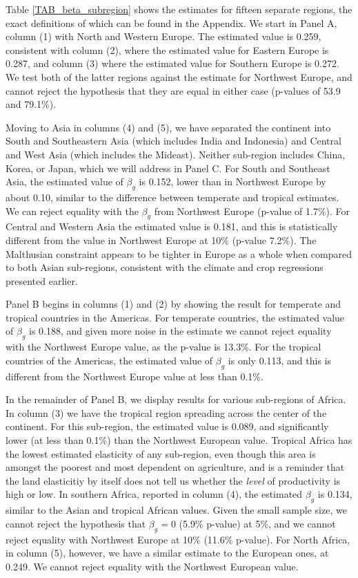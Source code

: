 Table \ref{TAB_beta_subregion} shows the estimates for fifteen separate regions, the exact definitions of which can be found in the Appendix. We start in Panel A, column (1) with North and Western Europe. The estimated value is 0.259, consistent with column (2), where the estimated value for Eastern Europe is 0.287, and column (3) where the estimated value for Southern Europe is 0.272. We test both of the latter regions against the estimate for Northwest Europe, and cannot reject the hypothesis that they are equal in either case (p-values of 53.9 and 79.1\%). 

Moving to Asia in columns (4) and (5), we have separated the continent into South and Southeastern Asia (which includes India and Indonesia) and Central and West Asia (which includes the Mideast). Neither sub-region includes China, Korea, or Japan, which we will address in Panel C. For South and Southeast Asia, the estimated value of $\beta_g$ is 0.152, lower than in Northwest Europe by about 0.10, similar to the difference between temperate and tropical estimates. We can reject equality with the $\beta_g$ from Northwest Europe (p-value of 1.7\%). For Central and Western Asia the estimated value is 0.181, and this is statistically different from the value in Northwest Europe at 10\% (p-value 7.2\%). The Malthusian constraint appears to be tighter in Europe as a whole when compared to both Asian sub-regions, consistent with the climate and crop regressions presented earlier.

Panel B begins in columns (1) and (2) by showing the result for temperate and tropical countries in the Americas. For temperate countries, the estimated value of $\beta_g$ is 0.188, and given more noise in the estimate we cannot reject equality with the Northwest Europe value, as the p-value is 13.3\%. For the tropical countries of the Americas, the estimated value of $\beta_g$ is only 0.113, and this is different from the Northwest Europe value at less than 0.1\%.

In the remainder of Panel B, we display results for various sub-regions of Africa. In column (3) we have the tropical region spreading across the center of the continent. For this sub-region, the estimated value is 0.089, and significantly lower (at less than 0.1\%) than the Northwest European value. Tropical Africa has the lowest estimated elasticity of any sub-region, even though this area is amongst the poorest and most dependent on agriculture, and is a reminder that the land elasticitiy by itself does not tell us whether the \textit{level} of productivity is high or low. In southern Africa, reported in column (4), the estimated $\beta_g$ is 0.134, similar to the Asian and tropical African values. Given the small sample size, we cannot reject the hypothesis that $\beta_g=0$ (5.9\% p-value) at 5\%, and we cannot reject equality with Northwest Europe at 10\% (11.6\% p-value). For North Africa, in column (5), however, we have a similar estimate to the European ones, at 0.249. We cannot reject equality with the Northwest European value.

